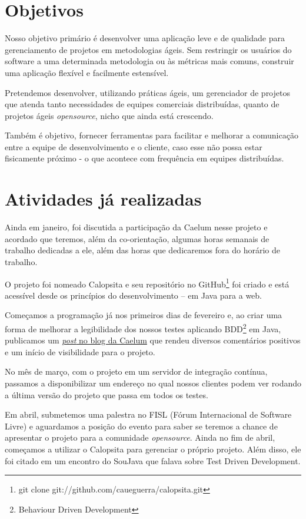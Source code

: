 \documentclass[titlepage]{article}
\begin{document}
\section{Objetivos}
Nosso objetivo primário é desenvolver uma aplicação leve e de qualidade para gerenciamento de projetos em metodologias ágeis. Sem restringir os usuários do software a uma determinada metodologia ou às métricas mais comuns, construir uma aplicação flexível e facilmente estensível.

Pretendemos desenvolver, utilizando práticas ágeis, um gerenciador de projetos que atenda tanto necessidades de equipes comerciais distribuídas, quanto de projetos ágeis \textit{opensource}, nicho que ainda está crescendo.

Também é objetivo, fornecer ferramentas para facilitar e melhorar a comunicação entre a equipe de desenvolvimento e o cliente, caso esse não possa estar fisicamente próximo - o que acontece com frequência em equipes distribuídas.

\section{Atividades já realizadas}
Ainda em janeiro, foi discutida a participação da Caelum nesse projeto e acordado que teremos, além da co-orientação, algumas horas semanais de trabalho dedicadas a ele, além das horas que dedicaremos fora do horário de trabalho.

O projeto foi nomeado Calopsita e seu repositório no GitHub\footnote{git clone git://github.com/caueguerra/calopsita.git} foi criado e está acessível desde os princípios do desenvolvimento -- em Java para a web.

Começamos a programação já nos primeiros dias de fevereiro e, ao criar uma forma de melhorar a legibilidade dos nossos testes aplicando BDD\footnote{Behaviour Driven Development} em Java, publicamos um \href{http://blog.caelum.com.br/2009/02/28/behavior-driven-development-com-junit/}{\textit{post} no blog da Caelum} que rendeu diversos comentários positivos e um início de visibilidade para o projeto.

No mês de março, com o projeto em um servidor de integração contínua, passamos a disponibilizar um endereço no qual nossos clientes podem ver rodando a última versão do projeto que passa em todos os testes.

Em abril, submetemos uma palestra no FISL (Fórum Internacional de Software Livre) e aguardamos a posição do evento para saber se teremos a chance de apresentar o projeto para a comunidade \textit{opensource}. Ainda no fim de abril, começamos a utilizar o Calopsita para gerenciar o próprio projeto. Além disso, ele foi citado em um encontro do SouJava que falava sobre Test Driven Development.
\end{document}
